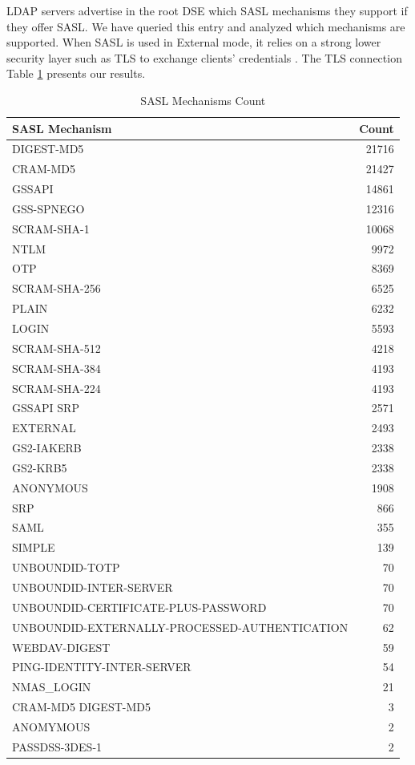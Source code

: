 LDAP servers advertise in the root DSE which SASL mechanisms they support if they offer SASL. We have queried this entry and analyzed which mechanisms are supported. When SASL is used in External mode, it relies on a strong lower security layer such as TLS to exchange clients' credentials \cite{rfc4513}. The TLS connection Table \ref{table:sasl_mechanisms} presents our results.

\begin{table}[htb]
\centering
\begin{tabular}{lr}
\toprule
SASL Mechanism & Count \\
\midrule
\midrule
DIGEST-MD5 & 21716 \\
CRAM-MD5 & 21427 \\
GSSAPI & 14861 \\
GSS-SPNEGO & 12316 \\
SCRAM-SHA-1 & 10068 \\
NTLM & 9972 \\
OTP & 8369 \\
SCRAM-SHA-256 & 6525 \\
PLAIN & 6232 \\
LOGIN & 5593 \\
SCRAM-SHA-512 & 4218 \\
SCRAM-SHA-384 & 4193 \\
SCRAM-SHA-224 & 4193 \\
GSSAPI SRP & 2571 \\
EXTERNAL & 2493 \\
GS2-IAKERB & 2338 \\
GS2-KRB5 & 2338 \\
ANONYMOUS & 1908 \\
SRP & 866 \\
SAML & 355 \\
SIMPLE & 139 \\
UNBOUNDID-TOTP & 70 \\
UNBOUNDID-INTER-SERVER & 70 \\
UNBOUNDID-CERTIFICATE-PLUS-PASSWORD & 70 \\
UNBOUNDID-EXTERNALLY-PROCESSED-AUTHENTICATION & 62 \\
WEBDAV-DIGEST & 59 \\
PING-IDENTITY-INTER-SERVER & 54 \\
NMAS\_LOGIN & 21 \\
CRAM-MD5 DIGEST-MD5 & 3 \\
ANOMYMOUS & 2 \\
PASSDSS-3DES-1 & 2 \\
\bottomrule
\end{tabular}
\caption{SASL Mechanisms Count }
\label{table:sasl_mechanisms}
\end{table}

